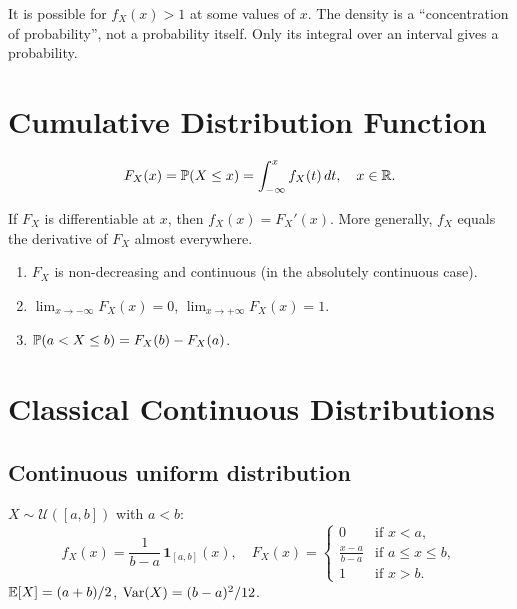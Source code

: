 \begin{warning}[title=\textbf{A density is not a probability}]
It is possible for $f_X(x) > 1$ at some values of $x$. The density is a
``concentration of probability'', not a probability itself. Only its integral
over an interval gives a probability.
\end{warning}

\section{Cumulative Distribution Function}

\begin{definition}[CDF]
\[
    F_X(x) = \mathbb{P}(X \leq x) = \int_{-\infty}^{x} f_X(t)\, dt, \quad x \in \mathbb{R}.
\]
\end{definition}

\begin{theorem}
If $F_X$ is differentiable at $x$, then $f_X(x) = F_X'(x)$. More generally,
$f_X$ equals the derivative of $F_X$ almost everywhere.
\end{theorem}

\begin{proposition}[Properties of $F_X$]
\begin{enumerate}[label=(\roman*)]
    \item $F_X$ is non-decreasing and continuous (in the absolutely continuous case).
    \item $\lim_{x \to -\infty} F_X(x) = 0$, $\lim_{x \to +\infty} F_X(x) = 1$.
    \item $\mathbb{P}(a < X \leq b) = F_X(b) - F_X(a)$.
\end{enumerate}
\end{proposition}

\section{Classical Continuous Distributions}

\subsection{Continuous uniform distribution}

\begin{definition}
$X \sim \mathcal{U}([a,b])$ with $a < b$:
\[
    f_X(x) = \frac{1}{b-a}\,\mathbf{1}_{[a,b]}(x), \quad
    F_X(x) = \begin{cases} 0 & \text{if } x < a, \\ \frac{x-a}{b-a} & \text{if } a \leq x \leq b, \\ 1 & \text{if } x > b. \end{cases}
\]
$\mathbb{E}[X] = (a+b)/2$, $\mathrm{Var}(X) = (b-a)^2/12$.
\end{definition}

